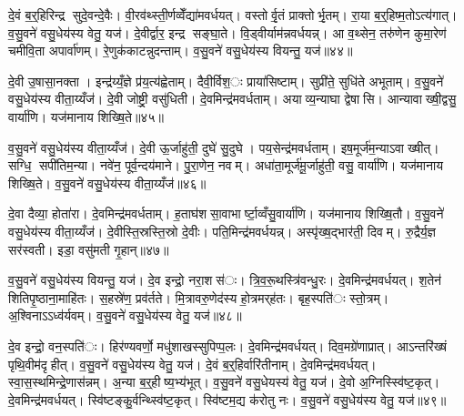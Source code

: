 दे॒वं ब॒र्॒हिरिन्द्र सुदे॒वन्दे॒वैः। वी॒रव॑थ्स्ती॒र्णव्वेँद्या॑मवर्धयत्। वस्तोर्वृ॒तं प्राक्तोर्भृ॒तम्। रा॒या ब॒र्॒हिष्म॒तोऽत्य॑गात्। व॒सु॒वने॑ वसु॒धेय॑स्य वेतु॒ यज॑। दे॒वीर्द्वार॒ इन्द्र सङ्घा॒ते। वि॒ड्वीर्याम॑न्नवर्धयन्न्। आ व॒थ्सेन॒ तरु॑णेन कुमा॒रेण॑ चमीवि॒ता अपार्वा॑णम्। रे॒णुक॑काटन्नुदन्ताम्। व॒सु॒वने॑ वसु॒धेय॑स्य वियन्तु॒ यज॑॥४४॥

दे॒वी उ॒षासा॒नक्ता। इन्द्र॑य्यँ॒ज्ञे प्र॑य॒त्य॑ह्वेताम्। दैवी॒र्विश॒ः प्राया॑सिष्टाम्। सुप्री॑ते॒ सुधि॑ते अभूताम्। व॒सु॒वने॑ वसु॒धेय॑स्य वीता॒य्यँज॑। दे॒वी जोष्ट्री॒ वसु॑धिती। दे॒वमिन्द्र॑मवर्धताम्। अयाव्य॒न्याघा द्वेषासि। आन्यावाख्षी॒द्वसु॒ वार्या॑णि। यज॑मानाय शिख्षि॒ते॥४५॥

व॒सु॒वने॑ वसु॒धेय॑स्य वीता॒य्यँज॑। दे॒वी ऊ॒र्जाहु॑ती॒ दुघे॑ सु॒दुघे। पय॒सेन्द्र॑मवर्धताम्। इष॒मूर्ज॑म॒न्याऽवाख्षीत्। सग्धि॒ सपी॑तिम॒न्या। नवे॑न॒ पूर्व॒न्दय॑माने। पु॒रा॒णेन॒ नवम्। अधा॑ता॒मूर्ज॑मू॒र्जाहु॑ती॒ वसु॒ वार्या॑णि। यज॑मानाय शिख्षि॒ते। व॒सु॒वने॑ वसु॒धेय॑स्य वीता॒य्यँज॑॥४६॥

दे॒वा दैव्या॒ होता॑रा। दे॒वमिन्द्र॑मवर्धताम्। ह॒ताघ॑शसा॒वाभार्ष्टा॒व्वँसु॒वार्या॑णि। यज॑मानाय शिख्षि॒तौ। व॒सु॒वने॑ वसु॒धेय॑स्य वीता॒य्यँज॑। दे॒वीस्ति॒स्रस्ति॒स्रो दे॒वीः। पति॒मिन्द्र॑मवर्धयन्न्। अस्पृ॑ख्ष॒द्भार॑ती॒ दिवम्। रु॒द्रैर्य॒ज्ञ सर॑स्वती। इडा॒ वसु॑मती गृ॒हान्॥४७॥

व॒सु॒वने॑ वसु॒धेय॑स्य वियन्तु॒ यज॑। दे॒व इन्द्रो॒ नरा॒शस॑ः। त्रि॒व॒रू॒थस्त्रि॑वन्धु॒रः। दे॒वमिन्द्र॑मवर्धयत्। श॒तेन॑ शितिपृ॒ष्ठाना॒माहि॑तः। स॒हस्रे॑ण॒ प्रव॑र्तते। मि॒त्रावरु॒णेद॑स्य हो॒त्रमर्‌ह॑तः। बृह॒स्पति॑ः स्तो॒त्रम्। अ॒श्विनाऽऽध्व॑र्यवम्। व॒सु॒वने॑ वसु॒धेय॑स्य वेतु॒ यज॑॥४८॥

दे॒व इन्द्रो॒ वन॒स्पति॑ः। हिर॑ण्यवर्णो॒ मधु॑शाखस्सुपिप्प॒लः। दे॒वमिन्द्र॑मवर्धयत्। दिव॒मग्रे॑णाप्रात्। आऽन्तरि॑ख्षं पृथि॒वीम॑दृहीत्। व॒सु॒वने॑ वसु॒धेय॑स्य वेतु॒ यज॑। दे॒वं ब॒र्॒हिर्वारि॑तीनाम्। दे॒वमिन्द्र॑मवर्धयत्। स्वा॒स॒स्थमिन्द्रे॒णास॑न्नम्। अ॒न्या ब॒र्॒हीष्य॒भ्य॑भूत्। व॒सु॒वने॑ वसु॒धेयस्य॑ वेतु॒ यज॑। दे॒वो अ॒ग्निस्स्वि॑ष्ट॒कृत्। दे॒वमिन्द्र॑मवर्धयत्। स्वि॑ष्टङ्कु॒र्वन्थ्स्वि॑ष्ट॒कृत्। स्वि॑ष्टम॒द्य क॑रोतु नः। व॒सु॒वने॑ वसु॒धेय॑स्य वेतु॒ यज॑॥४९॥


